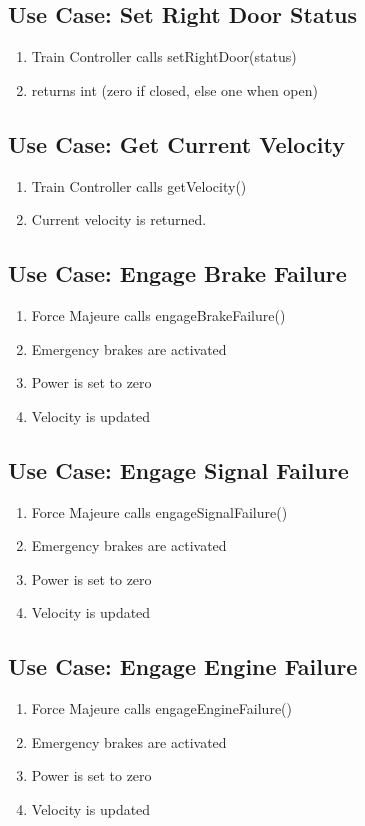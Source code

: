 \documentclass{scrreprt}
\begin{document}
\subsection{Use Case: Set Right Door Status}
\begin{enumerate}
	\item Train Controller calls setRightDoor(status)
	\item returns int (zero if closed, else one when open)
\end{enumerate}

\subsection{Use Case: Get Current Velocity}
\begin{enumerate}
	\item Train Controller calls getVelocity()
	\item Current velocity is returned.
\end{enumerate}

\subsection{Use Case: Engage Brake Failure}
\begin{enumerate}
	\item Force Majeure calls engageBrakeFailure()
  \item Emergency brakes are activated
  \item Power is set to zero
  \item Velocity is updated

\end{enumerate}

\subsection{Use Case: Engage Signal Failure}
\begin{enumerate}
	\item Force Majeure calls engageSignalFailure()
  \item Emergency brakes are activated
  \item Power is set to zero
  \item Velocity is updated
\end{enumerate}

\subsection{Use Case: Engage Engine Failure}
\begin{enumerate}
	\item Force Majeure calls engageEngineFailure()
  \item Emergency brakes are activated
  \item Power is set to zero
  \item Velocity is updated
\end{enumerate}
\end{document}
